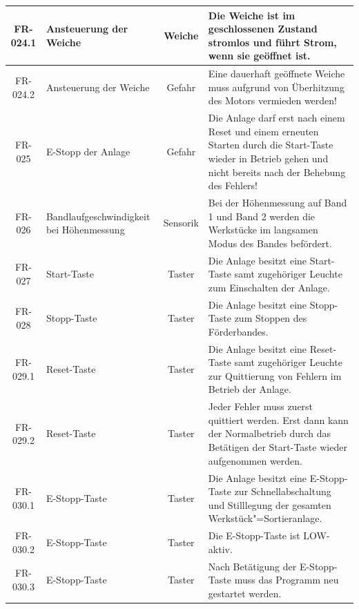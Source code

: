 \documentclass[oneside,a4paper,titlepage]{scrartcl}              %
\begin{document}
\begin{small}
\begin{center}
\begin{longtable}{|c|p{4cm}|c|p{7cm}|}
      \hline
      \rowcolor{lightgray} FR-024.1 & Ansteuerung der Weiche & Weiche & Die Weiche ist im geschlossenen Zustand stromlos und führt Strom, wenn sie geöffnet ist.\\
      \hline
      \rowcolor{lightgray} FR-024.2 & Ansteuerung der Weiche & Gefahr & Eine dauerhaft geöffnete Weiche muss aufgrund von Überhitzung des Motors vermieden werden!\\
      \hline
      FR-025 & E-Stopp der Anlage & Gefahr & Die Anlage darf erst nach einem Reset und einem erneuten Starten durch die Start-Taste wieder in Betrieb gehen und nicht bereits nach der Behebung des Fehlers!\\
      \hline
      \rowcolor{lightgray} FR-026 & Bandlaufgeschwindigkeit bei Höhenmessung & Sensorik & Bei der Höhenmessung auf Band 1 und Band 2 werden die Werkstücke im langsamen Modus des Bandes befördert.\\
      \hline
      FR-027 & Start-Taste & Taster & Die Anlage besitzt eine Start-Taste samt zugehöriger Leuchte zum Einschalten der Anlage.\\
      \hline
      \rowcolor{lightgray} FR-028 & Stopp-Taste & Taster & Die Anlage besitzt eine Stopp-Taste zum Stoppen des Förderbandes.\\
      \hline
      FR-029.1 & Reset-Taste & Taster & Die Anlage besitzt eine Reset-Taste samt zugehöriger Leuchte zur Quittierung von Fehlern im Betrieb der Anlage.\\
      \hline
      FR-029.2 & Reset-Taste & Taster & Jeder Fehler muss zuerst quittiert werden. Erst dann kann der Normalbetrieb durch das Betätigen der Start-Taste wieder aufgenommen werden.\\
      \hline
      \rowcolor{lightgray} FR-030.1 & E-Stopp-Taste & Taster & Die Anlage besitzt eine E-Stopp-Taste zur Schnellabschaltung und Stilllegung der gesamten Werkstück"=Sortieranlage.\\
      \hline
      \rowcolor{lightgray} FR-030.2 & E-Stopp-Taste & Taster & Die E-Stopp-Taste ist LOW-aktiv.\\
      \hline
      \rowcolor{lightgray} FR-030.3 & E-Stopp-Taste & Taster & Nach Betätigung der E-Stopp-Taste muss das Programm neu gestartet werden.\\
      \hline
    \end{longtable}
  \end{center}
\end{small}

\newpage

\end{document}
